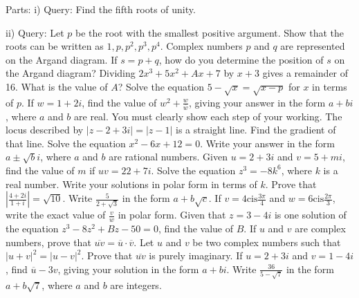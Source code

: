 \documentclass[12pt,addpoints]{exam}
\begin{document}
\begin{questions}
Parts:
i) Query: Find the fifth roots of unity.

ii) Query: Let \( p \) be the root with the smallest positive argument. Show that the roots can be written as \( 1, p, p^2, p^3, p^4 \).
\fillwithlines{5cm}
\question[5] Complex numbers \( p \) and \( q \) are represented on the Argand diagram. If \( s = p + q \), how do you determine the position of \( s \) on the Argand diagram?
\fillwithlines{5cm}
\question[5] Dividing \( 2x^3 + 5x^2 + Ax + 7 \) by \( x + 3 \) gives a remainder of 16. What is the value of \( A \)?
\fillwithlines{5cm}
\question[5] Solve the equation \( 5 - \sqrt{x} = \sqrt{x - p} \) for \( x \) in terms of \( p \).
\fillwithlines{5cm}
\question[5] If \( w = 1 + 2i \), find the value of \( w^2 + \frac{w}{\overline{w}} \), giving your answer in the form \( a + bi \), where \( a \) and \( b \) are real. You must clearly show each step of your working.
\fillwithlines{5cm}
\question[5] The locus described by \( |z - 2 + 3i| = |z - 1| \) is a straight line. Find the gradient of that line.
\fillwithlines{5cm}
\question[5] Solve the equation \(x^2 - 6x + 12 = 0\). Write your answer in the form \(a \pm \sqrt{b}i\), where \(a\) and \(b\) are rational numbers.
\fillwithlines{5cm}
\question[5] Given \( u = 2 + 3i \) and \( v = 5 + mi \), find the value of \( m \) if \( uv = 22 + 7i \).
\fillwithlines{5cm}
\question[5] Solve the equation \(z^3 = -8k^6\), where \(k\) is a real number. Write your solutions in polar form in terms of \(k\).
\fillwithlines{5cm}
\question[5] Prove that \(\left| \frac{4 + 2i}{1 + i} \right| = \sqrt{10}\).
\fillwithlines{5cm}
\question[5] Write \( \frac{5}{2+\sqrt{3}} \) in the form \( a + b\sqrt{c} \).
\fillwithlines{5cm}
\question[5] If \( v = 4 \text{cis} \frac{3\pi}{4} \) and \( w = 6 \text{cis} \frac{2\pi}{3} \), write the exact value of \( \frac{v}{w} \) in polar form.
\fillwithlines{5cm}
\question[5] Given that \( z = 3 - 4i \) is one solution of the equation \( z^3 - 8z^2 + Bz - 50 = 0 \), find the value of \( B \).
\fillwithlines{5cm}
\question[5] If \( u \) and \( v \) are complex numbers, prove that \( \overline{uv} = \overline{u} \cdot \overline{v} \).
\fillwithlines{5cm}
\question[5] Let \( u \) and \( v \) be two complex numbers such that \( |u+v|^2 = |u-v|^2 \). Prove that \( \overline{uv} \) is purely imaginary.
\fillwithlines{5cm}
\question[5] If \( u = 2 + 3i \) and \( v = 1 - 4i \), find \( \overline{u} - 3v \), giving your solution in the form \( a + bi \).
\fillwithlines{5cm}
\question[5] Write \( \frac{36}{5 - \sqrt{7}} \) in the form \( a + b\sqrt{7} \), where \( a \) and \( b \) are integers.

\end{questions}
\end{document}
